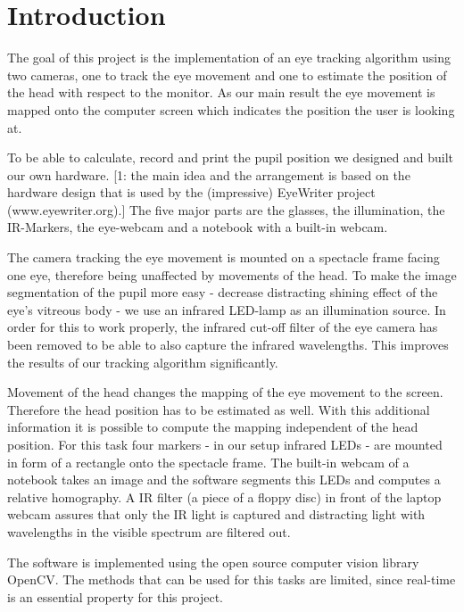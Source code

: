 \section{Introduction}\label{introduction}

The goal of this project is the implementation of an eye tracking algorithm using two cameras, one to track the eye movement and one to estimate the position of the head with respect to the monitor. As our main result the eye movement is mapped onto the computer screen which indicates the position the user is looking at. 

To be able to calculate, record and print the pupil position we designed and built our own hardware. [1: the main idea and the arrangement is based on the hardware design that is used by the (impressive) EyeWriter project (www.eyewriter.org).] 
The five major parts are the glasses, the illumination, the IR-Markers, the eye-webcam and a notebook with a built-in webcam.

The camera tracking the eye movement is mounted on a spectacle frame facing one eye, therefore being unaffected by movements of the head. 
To make the image segmentation of the pupil more easy - decrease distracting shining effect of the eye's vitreous body - we use an infrared LED-lamp as an illumination source. In order for this to work properly, the infrared cut-off filter of the eye camera has been removed to be able to also capture the infrared wavelengths. This improves the results of our tracking algorithm significantly.

Movement of the head changes the mapping of the eye movement to the screen. Therefore the head position has to be estimated as well.
With this additional information it is possible to compute the mapping independent of the head position. 
For this task four markers - in our setup infrared LEDs - are mounted in form of a rectangle onto the spectacle frame. The built-in webcam of a notebook takes an image and the software segments this LEDs and computes a relative homography. A IR filter (a piece of a floppy disc) in front of the laptop webcam assures that only the IR light is captured and distracting light with wavelengths in the visible spectrum are filtered out.

The software is implemented using the open source computer vision library OpenCV. The methods that can be used for this tasks are limited, since real-time is an essential property for this project.

